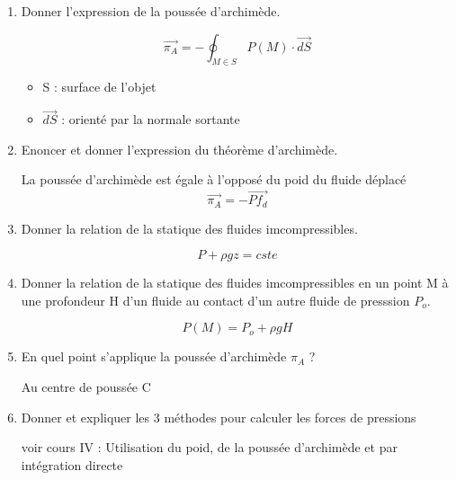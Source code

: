 \documentclass{article}
\begin{document}
\begin{enumerate}[label=\arabic{enumi} - , left=0pt, itemsep=1em]
     \item Donner l'expression de la poussée d'archimède. \par
     \begin{solution}
         \[ \vec{\pi_A} = -\oint_{M \in S} P(M) \cdot \vec{dS} \]
         \begin{itemize}
          \tiny\item   S : surface de l'objet
          \tiny\item   $\vec{dS}$ : orienté par la normale sortante
      \end{itemize}  
      \end{solution}

      \item Enoncer et donner l'expression du théorème d'archimède. \par
      \begin{solution}
          La poussée d'archimède est égale à l'opposé du poid du fluide déplacé
          \[\vec{\pi_A} = - \overrightarrow{Pf_d} \] 
       \end{solution}

       \item Donner la relation de la statique des fluides imcompressibles. \par
       \begin{solution}
          \[ P + \rho g z = cste\]
        \end{solution}

        \item Donner la relation de la statique des fluides imcompressibles en un point M à une profondeur H d'un fluide au contact d'un autre fluide de presssion $P_o$. \par
        \begin{solution}
           \[P(M) = P_o + \rho g H\]
           
         \end{solution}

         \item En quel point s'applique la poussée d'archimède $\pi_A$ ? \par
         \begin{solution}
            Au centre de poussée C
          \end{solution}


         \item Donner et expliquer les 3 méthodes pour calculer les forces de pressions \par
         \begin{solution}
            voir cours IV : Utilisation du poid, de la poussée d'archimède et par intégration directe
          \end{solution}
\end{enumerate}
\end{document}

